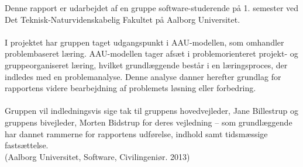 Denne rapport er udarbejdet af en gruppe software-studerende på 1. semester ved Det Teknisk-Naturvidenskabelig Fakultet på Aalborg Universitet. \\\\
I projektet har gruppen taget udgangspunkt i AAU-modellen, som omhandler problembaseret læring.
AAU-modellen tager afsæt i problemorienteret projekt- og gruppeorganiseret læring, hvilket grundlæggende består i en læringsproces, der indledes med en problemanalyse. Denne analyse danner herefter grundlag for rapportens videre bearbejdning af problemets løsning eller forbedring. \\\\
Gruppen vil indledningsvis sige tak til gruppens hovedvejleder, Jane Billestrup og gruppens bivejleder, Morten Bidstrup for deres vejledning – som grundlæggende har dannet rammerne for rapportens udførelse, indhold samt tidsmæssige fastsættelse. \\

(Aalborg Universitet, Software, Civilingeniør. 2013)
